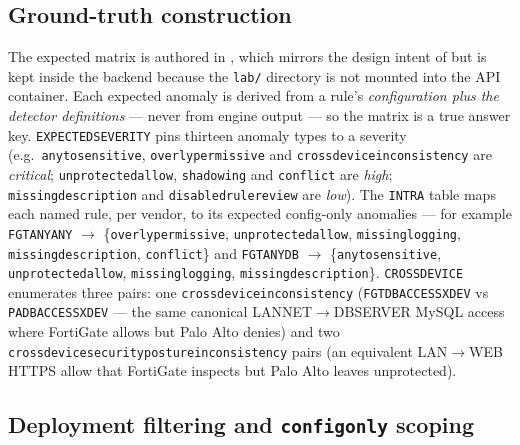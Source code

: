 \documentclass[12pt,a4paper]{report}
\renewcommand{\_}{\textunderscore\allowbreak}
\begin{document}
\subsection{Ground-truth construction}

The expected matrix is authored in , which mirrors the design intent of  but is kept inside the backend because the \texttt{lab/} directory is not mounted into the API container. Each expected anomaly is derived from a rule's \emph{configuration plus the detector definitions} --- never from engine output --- so the matrix is a true answer key. \texttt{EXPECTED\_SEVERITY} pins thirteen anomaly types to a severity (e.g.\ \texttt{any\_to\_sensitive}, \texttt{overly\_permissive} and \texttt{cross\_device\_inconsistency} are \emph{critical}; \texttt{unprotected\_allow}, \texttt{shadowing} and \texttt{conflict} are \emph{high}; \texttt{missing\_description} and \texttt{disabled\_rule\_review} are \emph{low}). The \texttt{INTRA} table maps each named rule, per vendor, to its expected config-only anomalies --- for example \texttt{FGT\_ANY\_ANY} $\rightarrow$ \{\texttt{overly\_permissive}, \texttt{unprotected\_allow}, \texttt{missing\_logging}, \texttt{missing\_description}, \texttt{conflict}\} and \texttt{FGT\_ANY\_DB} $\rightarrow$ \{\texttt{any\_to\_sensitive}, \texttt{unprotected\_allow}, \texttt{missing\_logging}, \texttt{missing\_description}\}. \texttt{CROSS\_DEVICE} enumerates three pairs: one \texttt{cross\_device\_inconsistency} (\texttt{FGT\_DB\_ACCESS\_XDEV} vs \texttt{PA\_DB\_ACCESS\_XDEV} --- the same canonical LAN\_NET$\rightarrow$DB\_SERVER MySQL access where FortiGate allows but Palo Alto denies) and two \texttt{cross\_device\_security\_posture\_inconsistency} pairs (an equivalent LAN$\rightarrow$WEB HTTPS allow that FortiGate inspects but Palo Alto leaves unprotected).

\subsection{Deployment filtering and \texttt{config\_only} scoping}
\end{document}
